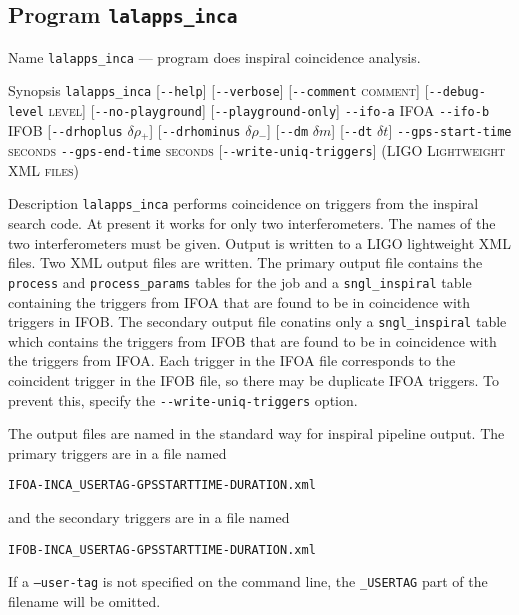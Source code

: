 \subsection{Program \texttt{lalapps\_inca}}
\label{program:lalapps-inca}

\begin{entry}
\item[Name]
\verb$lalapps_inca$ --- program does inspiral coincidence analysis.

\item[Synopsis]
\verb$lalapps_inca$ 
[\verb$--help$]
[\verb$--verbose$]
[\verb$--comment$ \textsc{comment}]
[\verb$--debug-level$ \textsc{level}] \newline
%
[\verb$--no-playground$]
[\verb$--playground-only$]
\verb$--ifo-a$ \textsc{IFOA} 
\verb$--ifo-b$ \textsc{IFOB} \newline
%
[\verb$--drhoplus$ \textsc{$\delta\rho_{+}$}]
[\verb$--drhominus$ \textsc{$\delta\rho_{-}$}]
[\verb$--dm$ \textsc{$\delta m$}]
[\verb$--dt$ \textsc{$\delta t$}] \newline
%
\verb$--gps-start-time$ \textsc{seconds} 
\verb$--gps-end-time$ \textsc{seconds} 
[\verb$--write-uniq-triggers$] \newline
%
\textsc{(LIGO Lightweight XML files)}

\item[Description] 
\verb$lalapps_inca$ performs coincidence on triggers from the inspiral
search code.  At present it works for only two interferometers. The names
of the two interferometers must be given. Output is written to a LIGO
lightweight XML files. Two XML output files are written.  The primary output
file contains the \texttt{process} and \texttt{process\_params} tables for the
job and a \texttt{sngl\_inspiral} table containing the triggers from
\textsc{IFOA} that are found to be in coincidence with triggers in
\textsc{IFOB}. The secondary output file conatins only a
\texttt{sngl\_inspiral} table which contains the triggers from \textsc{IFOB}
that are found to be in coincidence with the triggers from \textsc{IFOA}. 
Each trigger in the \textsc{IFOA} file corresponds to the coincident trigger
in the \textsc{IFOB} file, so there may be duplicate  \textsc{IFOA} triggers.
To prevent this, specify the \verb$--write-uniq-triggers$ option.

The output files are named in the standard way for inspiral pipeline output.
The primary triggers are in a file named\\
\begin{center}
\texttt{IFOA-INCA\_USERTAG-GPSSTARTTIME-DURATION.xml}\\
\end{center}
and the secondary triggers are in a file named\\
\begin{center}
\texttt{IFOB-INCA\_USERTAG-GPSSTARTTIME-DURATION.xml}\\
\end{center}
If a \texttt{--user-tag} is not specified on the command line, the
\texttt{\_USERTAG} part of the filename will be omitted.


\end{entry}
